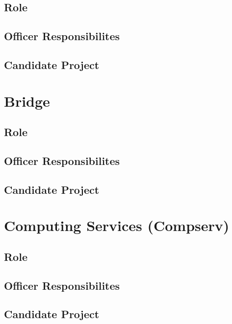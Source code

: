 \documentclass[11pt, article, oneside]{memoir}
\begin{document}
    \subsection{Role}

    \subsection{Officer Responsibilites}

    \subsection{Candidate Project}

    \section{Bridge}
    \subsection{Role}

    \subsection{Officer Responsibilites}

    \subsection{Candidate Project}

    \bigbreak


    \section{Computing Services (Compserv)}
    \subsection{Role}

    \subsection{Officer Responsibilites}

    \subsection{Candidate Project}

    \bigbreak

    
\end{document}
